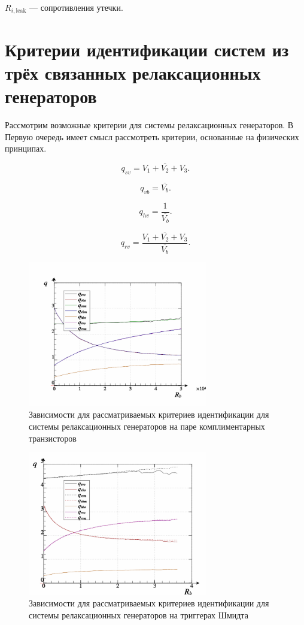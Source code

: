 $R_{i,\mathrm{leak}}$ --- сопротивления утечки.



\section{Критерии идентификации систем из трёх связанных релаксационных генераторов}

Рассмотрим возможные критерии для системы релаксационных
генераторов. В Первую очередь имеет смысл
рассмотреть критерии, основанные на физических принципах.


\[
  q_{sv} = \overline{V_1+V_2+V_3} .
 \]

\[
  q_{vb} = \overline{V_b} .
\]

\[
  q_{hv} = \frac{1}{\overline{V_b}} .
\]

\[
  q_{rv} = \frac{\overline{V_1+V_2+V_3}}{\overline{V_b}}.
\]

\begin{figure}[htb!]
  \centerline{\includegraphics[width=0.7\textwidth]{p/relax3_read_q-p_q1.png} }
  \caption{Зависимости для рассматриваемых критериев идентификации для системы релаксационных генераторов на паре комплиментарных транзисторов}
  \label{atu:f:relax3d_q}
\end{figure}

\begin{figure}[htb!]
  \centerline{\includegraphics[width=0.7\textwidth]{p/relax3ds_read_q-p_q1.png} }
  \caption{Зависимости для рассматриваемых критериев идентификации для системы релаксационных генераторов на триггерах Шмидта}
  \label{atu:f:relax3ds_q}
\end{figure}

